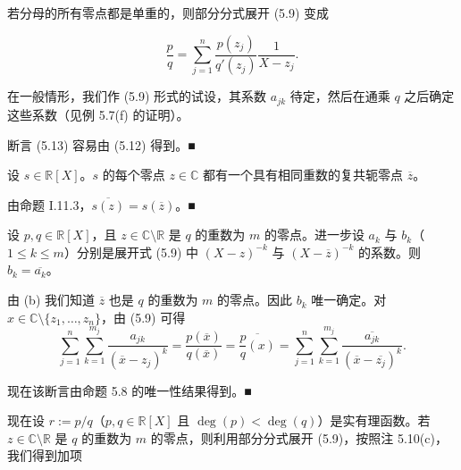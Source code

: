 \begin{remark}

\begin{items}
\item

若分母的所有零点都是单重的，则部分分式展开 (5.9) 变成

\begin{equation}
\frac{p}{q} = \sum_{j=1}^{n} \frac{p(z_j)}{q'(z_j)} \frac{1}{X - z_j} .\tag{5.13}
\end{equation}

在一般情形，我们作 (5.9) 形式的试设，其系数 $ a_{jk} $ 待定，然后在通乘 $ q $ 之后确定这些系数（见例 5.7(f) 的证明）。

\proofhead
断言 (5.13) 容易由 (5.12) 得到。\nobreak\hspace{0.35em}■
\item

设 $ s \in \mathbb{R}[X] $。$ s $ 的每个零点 $ z \in \mathbb{C} $ 都有一个具有相同重数的复共轭零点 $ \overline{z} $。

\proofhead
由命题 I.11.3，$ \overline{s(z)} = s(\overline{z}) $。\nobreak\hspace{0.35em}■
\item

设 $ p, q \in \mathbb{R}[X] $，且 $ z \in \mathbb{C} \setminus \mathbb{R} $ 是 $ q $ 的重数为 $ m $ 的零点。进一步设 $ a_k $ 与 $ b_k $（$ 1 \le k \le m $）分别是展开式 (5.9) 中 $ (X - z)^{-k} $ 与 $ (X - \overline{z})^{-k} $ 的系数。则 $ b_k = \overline{a_k} $。

\proofhead
由 (b) 我们知道 $ \overline{z} $ 也是 $ q $ 的重数为 $ m $ 的零点。因此 $ b_k $ 唯一确定。对 $ x \in \mathbb{C} \setminus \{z_1, \ldots, z_n\} $，由 (5.9) 可得
\[
\sum_{j=1}^{n} \sum_{k=1}^{m_j} \frac{a_{jk}}{(\overline{x} - z_j)^k} = \frac{p(\overline{x})}{q(\overline{x})} = \overline{\frac{p}{q}(x)} = \sum_{j=1}^{n} \sum_{k=1}^{m_j} \frac{\overline{a_{jk}}}{(\overline{x} - \overline{z_j})^k} .
\]

现在该断言由命题 5.8 的唯一性结果得到。\nobreak\hspace{0.35em}■

\end{items}

\end{remark}

现在设 $ r := p/q $（$ p, q \in \mathbb{R}[X] $ 且 $ \deg(p) < \deg(q) $）是实有理函数。若 $ z \in \mathbb{C} \setminus \mathbb{R} $ 是 $ q $ 的重数为 $ m $ 的零点，则利用部分分式展开 (5.9)，按照注 5.10(c)，我们得到加项

